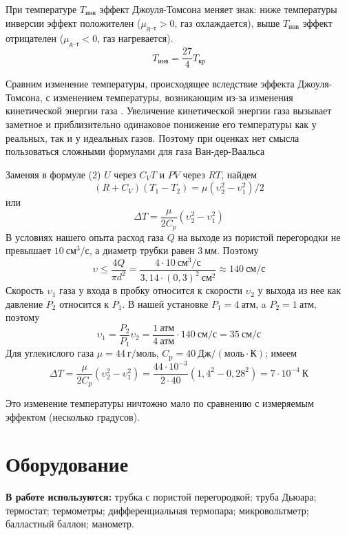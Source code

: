 \documentclass[a4paper,12pt]{article}
\theoremstyle{plain} %
\theoremstyle{definition} %
\theoremstyle{remark} %
\begin{document}
При температуре $T_\text{инв}$ эффект Джоуля-Томсона меняет знак: ниже температуры инверсии эффект положителен ($\mu_\text{д--т} > 0$, газ охлаждается), выше $T_\text{инв}$ эффект отрицателен ($\mu_\text{д--т} < 0$, газ нагревается).
\begin{equation}
T_\text{инв} = \frac{27}{4} T_\text{кр}
\end{equation}

Сравним изменение температуры, происходящее вследствие эффекта Джоуля-Томсона, с изменением температуры, возникающим из-за изменения кинетической энергии газа . Увеличение кинетической энергии газа вызывает заметное и приблизительно одинаковое понижение его температуры как у реальных, так и у идеальных газов. Поэтому при оценках нет смысла пользоваться сложными формулами для газа Ван-дер-Ваальса

Заменяя в формуле (2) $U$ через $C_V T$ и $PV$ через $RT$, найдем
\[ (R+C_V)(T_1 - T_2) = \mu (\upsilon_2^2-\upsilon_1^2)/2\]
или 
\[\Delta T = \frac{\mu}{2C_p} (\upsilon_2^2-\upsilon_1^2)\]
В условиях нашего опыта расход газа $Q$ на выходе из пористой перегородки не превышает $10 \ \text{см}^3/\text{с}$, а диаметр трубки равен $3\ \text{мм}$. Поэтому
\[\upsilon \leqslant \frac{4 Q}{\pi d^2} = \frac{4 \cdot 10\ \text{см}^3/\text{с}}{3,14 \cdot (0,3)^2 \ \text{см}^2}\approx 140\ \text{см}/\text{с}\]
Скорость $\upsilon_1$ газа у входа в пробку относится к скорости $\upsilon_2$ у выхода из нее как давление $P_2$ относится к $P_1$. В нашей установке $P_1 = 4\ \text{атм}$, a $P_2 = 1\ \text{атм}$, поэтому
\[\upsilon_1 = \frac{P_2}{P_1} \upsilon_2 = \frac{1\ \text{атм}}{4\ \text{атм}}\cdot 140 \ \text{см}/\text{с}  = 35 \ \text{см}/\text{с}\]
Для углекислого газа $\mu = 44\ \text{г}/\text{моль}$, $C_\text{p} = 40\ \text{Дж}/(\text{моль} \cdot \text{К})$; имеем
\[\Delta T = \frac{\mu}{2 C_p}(\upsilon_2^2 - \upsilon_1^2) = \frac{44\cdot10^{-3}}{2\cdot 40}(1,4^2 - 0,28^2) = 7\cdot 10^{-4} \ \text{К}\]

Это изменение температуры ничтожно мало по сравнению с измеряемым эффектом (несколько градусов).
	\section{Оборудование}
	\textbf{В работе используются:} трубка с пористой перегородкой; труба Дьюара; термостат; термометры; дифференциальная термопара; микровольтметр; балластный баллон; манометр.
	
\end{document}
